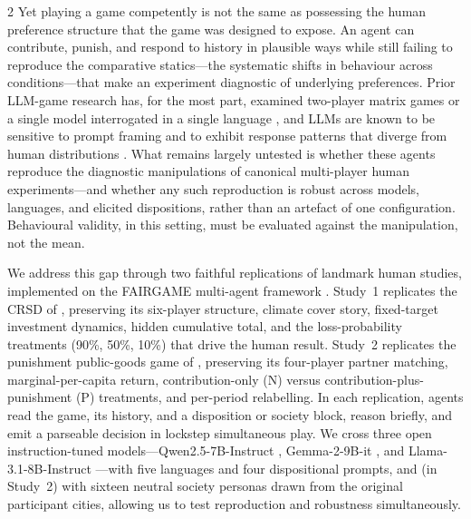 \documentclass[openacc]{rsproca_new}%
\begin{document}
\begin{multicols}{2}
Yet playing a game competently is not the same as possessing the human preference structure that the game was designed to expose. An agent can contribute, punish, and respond to history in plausible ways while still failing to reproduce the comparative statics---the systematic shifts in behaviour across conditions---that make an experiment diagnostic of underlying preferences. Prior LLM-game research has, for the most part, examined two-player matrix games or a single model interrogated in a single language \cite{akata2023playing,brookins2023playing}, and LLMs are known to be sensitive to prompt framing and to exhibit response patterns that diverge from human distributions \cite{tjuatja2024llms}. What remains largely untested is whether these agents reproduce the diagnostic manipulations of canonical multi-player human experiments---and whether any such reproduction is robust across models, languages, and elicited dispositions, rather than an artefact of one configuration. Behavioural validity, in this setting, must be evaluated against the manipulation, not the mean.

We address this gap through two faithful replications of landmark human studies, implemented on the FAIRGAME multi-agent framework \cite{fairgame2025}. Study~1 replicates the CRSD of \cite{milinski2008climate}, preserving its six-player structure, climate cover story, fixed-target investment dynamics, hidden cumulative total, and the loss-probability treatments (90\%, 50\%, 10\%) that drive the human result. Study~2 replicates the punishment public-goods game of \cite{herrmann2008antisocial}, preserving its four-player partner matching, marginal-per-capita return, contribution-only (N) versus contribution-plus-punishment (P) treatments, and per-period relabelling. In each replication, agents read the game, its history, and a disposition or society block, reason briefly, and emit a parseable decision in lockstep simultaneous play. We cross three open instruction-tuned models---Qwen2.5-7B-Instruct \cite{qwen2025}, Gemma-2-9B-it \cite{gemma2024}, and Llama-3.1-8B-Instruct \cite{llama2024}---with five languages and four dispositional prompts, and (in Study~2) with sixteen neutral society personas drawn from the original participant cities, allowing us to test reproduction and robustness simultaneously.


\end{multicols}
\end{document}
